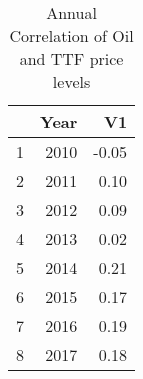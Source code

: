 \begin{table}[ht]
\centering
\begin{tabular}{rrr}
  \hline
 & Year & V1 \\ 
  \hline
1 & 2010 & -0.05 \\ 
  2 & 2011 & 0.10 \\ 
  3 & 2012 & 0.09 \\ 
  4 & 2013 & 0.02 \\ 
  5 & 2014 & 0.21 \\ 
  6 & 2015 & 0.17 \\ 
  7 & 2016 & 0.19 \\ 
  8 & 2017 & 0.18 \\ 
   \hline
\end{tabular}
\caption{Annual Correlation of Oil and TTF price levels} 
\label{tab:oil_ttf_diff_corr_annual}
\end{table}
